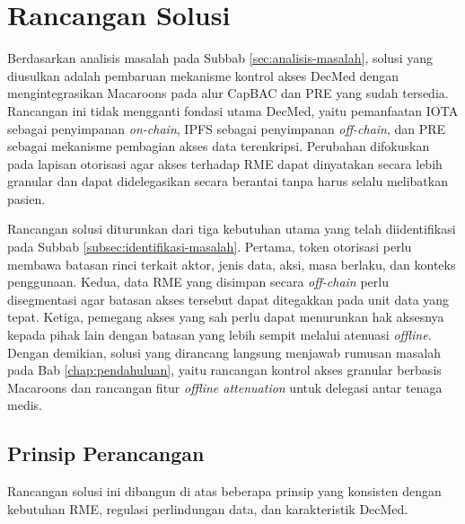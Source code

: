 \section{Rancangan Solusi}
\label{sec:rancangan-solusi}

Berdasarkan analisis masalah pada Subbab \ref{sec:analisis-masalah}, solusi yang diusulkan adalah pembaruan mekanisme kontrol akses DecMed dengan mengintegrasikan Macaroons pada alur CapBAC dan PRE yang sudah tersedia. Rancangan ini tidak mengganti fondasi utama DecMed, yaitu pemanfaatan IOTA sebagai penyimpanan \textit{on-chain}, IPFS sebagai penyimpanan \textit{off-chain}, dan PRE sebagai mekanisme pembagian akses data terenkripsi. Perubahan difokuskan pada lapisan otorisasi agar akses terhadap RME dapat dinyatakan secara lebih granular dan dapat didelegasikan secara berantai tanpa harus selalu melibatkan pasien.

Rancangan solusi diturunkan dari tiga kebutuhan utama yang telah diidentifikasi pada Subbab \ref{subsec:identifikasi-masalah}. Pertama, token otorisasi perlu membawa batasan rinci terkait aktor, jenis data, aksi, masa berlaku, dan konteks penggunaan. Kedua, data RME yang disimpan secara \textit{off-chain} perlu disegmentasi agar batasan akses tersebut dapat ditegakkan pada unit data yang tepat. Ketiga, pemegang akses yang sah perlu dapat menurunkan hak aksesnya kepada pihak lain dengan batasan yang lebih sempit melalui atenuasi \textit{offline}. Dengan demikian, solusi yang dirancang langsung menjawab rumusan masalah pada Bab \ref{chap:pendahuluan}, yaitu rancangan kontrol akses granular berbasis Macaroons dan rancangan fitur \textit{offline attenuation} untuk delegasi antar tenaga medis.

\subsection{Prinsip Perancangan}
\label{subsec:prinsip-perancangan}

Rancangan solusi ini dibangun di atas beberapa prinsip yang konsisten dengan kebutuhan RME, regulasi perlindungan data, dan karakteristik DecMed.


